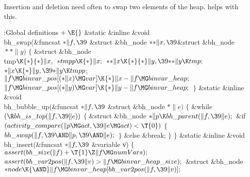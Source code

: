 Insertion and deletion need often to swap two elements of the heap. 
helps with this.

\Y\B\4:Global definitions\X${}\mathrel+\E{}$\6
\&{static} \&{inline} \&{void} \\{bh\_swap}(\&{funcsat} ${}{*}\|f,\39{}$%
\&{struct} \&{bh\_node} ${}{*}{*}\|x,\39{}$\&{struct} \&{bh\_node} ${}{*}{*}%
\|y){}$\1\1\2\2\6
${}\{{}$\1\6
\&{struct} \&{bh\_node} \\{tmp}${}\K{*}{*}\|x,{}$ ${}{*}\\{tmpp}\K{*}\|x;{}$\7
${}{*}{*}\|x\K{*}{*}\|y,\39{*}{*}\|y\K\\{tmp};{}$\6
${}{*}\|x\K{*}\|y,\39{*}\|y\K\\{tmpp}{}$;\6
${}\|f\MG\\{binvar\_pos}[({*}\|x)\MG\\{var}]\K{*}\|x-\|f\MG\\{binvar\_heap};{}$%
\6
${}\|f\MG\\{binvar\_pos}[({*}\|y)\MG\\{var}]\K{*}\|y-\|f\MG\\{binvar\_heap};{}$%
\6
\4${}\}{}$\2\7
\&{static} \&{inline} \&{void} \\{bh\_bubble\_up}(\&{funcsat} ${}{*}\|f,\39{}$%
\&{struct} \&{bh\_node} ${}{*}\|e){}$\1\1\2\2\6
${}\{{}$\1\6
\&{while} ${}(\R\\{bh\_is\_top}(\|f,\39\|e)){}$\5
${}\{{}$\1\6
\&{struct} \&{bh\_node} ${}{*}\|p\K\\{bh\_parent}(\|f,\39\|e);{}$\7
\&{if} ${}(\\{activity\_compare}(\|p\MG\\{act},\39\|e\MG\\{act})<\T{0}){}$\5
${}\{{}$\1\6
${}\\{bh\_swap}(\|f,\39{\AND}\|p,\39{\AND}\|e);{}$\6
\4${}\}{}$\2\6
\&{else}\1\5
\&{break};\2\6
\4${}\}{}$\2\6
\4${}\}{}$\2\7
\&{static} \&{inline} \&{void} \\{bh\_insert}(\&{funcsat} ${}{*}\|f,\39{}$%
\&{variable} \|v)\1\1\2\2\6
${}\{{}$\1\6
${}\\{assert}(\\{bh\_size}(\|f)+\T{1}\Z\|f\MG\\{numVars});{}$\6
${}\\{assert}(\\{bh\_var2pos}(\|f,\39\|v)>\|f\MG\\{binvar\_heap\_size});{}$\7
\&{struct} \&{bh\_node} ${}{*}\\{node}\K{\AND}\|f\MG\\{binvar\_heap}[\\{bh%
\_var2pos}(\|f,\39\|v)];{}$\7
